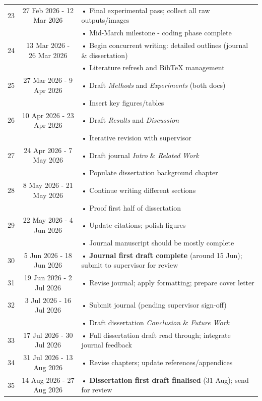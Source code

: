 \begin{longtable}{@{} c c p{10.5cm} @{}}
\midrule
23 & 27 Feb 2026 - 12 Mar 2026 & • Final experimental pass; collect all raw outputs/images\\
   &                & • Mid-March milestone - coding phase complete\\
\midrule
24 & 13 Mar 2026 - 26 Mar 2026 & • Begin concurrent writing: detailed outlines (journal \& dissertation)\\
   &                & • Literature refresh and BibTeX management\\
\midrule
25 & 27 Mar 2026 - 9 Apr 2026 & • Draft \emph{Methods} and \emph{Experiments} (both docs)\\
   &                & • Insert key figures/tables\\
\midrule
26 & 10 Apr 2026 - 23 Apr 2026 & • Draft \emph{Results} and \emph{Discussion}\\
   &                & • Iterative revision with supervisor\\
\midrule
27 & 24 Apr 2026 - 7 May 2026 & • Draft journal \emph{Intro} \& \emph{Related Work}\\
   &                & • Populate dissertation background chapter\\
\midrule
28 & 8 May 2026 - 21 May 2026 & • Continue writing different sections\\
   &                & • Proof first half of dissertation\\
\midrule
29 & 22 May 2026 - 4 Jun 2026 & • Update citations; polish figures\\
   &                & • Journal manuscript should be mostly complete\\
\midrule
30 & 5 Jun 2026 - 18 Jun 2026 & • \textbf{Journal first draft complete} (around 15 Jun); submit to supervisor for review\\
\midrule
31 & 19 Jun 2026 - 2 Jul 2026 & • Revise journal; apply formatting; prepare cover letter\\
\midrule
32 & 3 Jul 2026 - 16 Jul 2026 & • Submit journal (pending supervisor sign-off)\\
   &                & • Draft dissertation \emph{Conclusion} \& \emph{Future Work}\\
\midrule
33 & 17 Jul 2026 - 30 Jul 2026 & • Full dissertation draft read through; integrate journal feedback\\
\midrule
34 & 31 Jul 2026 - 13 Aug 2026 & • Revise chapters; update references/appendices\\
\midrule
35 & 14 Aug 2026 - 27 Aug 2026 & • \textbf{Dissertation first draft finalised} (31 Aug); send for review\\

\end{longtable}

